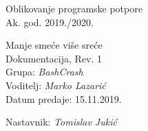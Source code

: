 \documentclass[12pt]{report}
\begin{document}
	

	\begin{titlepage}
		\begin{center}
			\LARGE Oblikovanje programske potpore\\
			\large Ak. god. 2019./2020.\\
			
			
			\huge Manje smeće više sreće\\
			\Large Dokumentacija, Rev. 1\\
			
			\normalsize
			Grupa: \textit{BashCrash}\\
			Voditelj: \textit{Marko Lazarić}\\
			
			
			Datum predaje: 15.11.2019.\\
	
			
			Nastavnik: \textit{Tomislav Jukić}\\
		
		\end{center}

	
	\end{titlepage}

	
	\tableofcontents

	
	
	
	
	
	
	
	
	
	\begingroup
	\renewcommand*\listfigurename{Indeks slika i dijagrama}
	\listoffigures
	\endgroup


	
	\eject 
		
	
\end{document}
